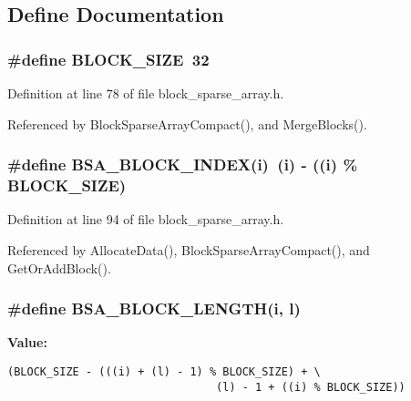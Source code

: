 \subsection{Define Documentation}
\subsubsection{\setlength{\rightskip}{0pt plus 5cm}\#define BLOCK\_\-SIZE~32}\label{block__sparse__array_8h_d51ded0bbd705f02f73fc60c0b721ced}




Definition at line 78 of file block\_\-sparse\_\-array.h.

Referenced by Block\-Sparse\-Array\-Compact(), and Merge\-Blocks().
\subsubsection{\setlength{\rightskip}{0pt plus 5cm}\#define BSA\_\-BLOCK\_\-INDEX(i)~(i) - ((i) \% BLOCK\_\-SIZE)}\label{block__sparse__array_8h_962e578d84d24522c6e235e7817c8928}




Definition at line 94 of file block\_\-sparse\_\-array.h.

Referenced by Allocate\-Data(), Block\-Sparse\-Array\-Compact(), and Get\-Or\-Add\-Block().
\subsubsection{\setlength{\rightskip}{0pt plus 5cm}\#define BSA\_\-BLOCK\_\-LENGTH(i, l)}\label{block__sparse__array_8h_b2792f873af43c3bd741898e64cf0cf6}


\textbf{Value:}

\begin{Code}\begin{verbatim}(BLOCK_SIZE - (((i) + (l) - 1) % BLOCK_SIZE) + \
                                (l) - 1 + ((i) % BLOCK_SIZE))
\end{verbatim}\end{Code}


